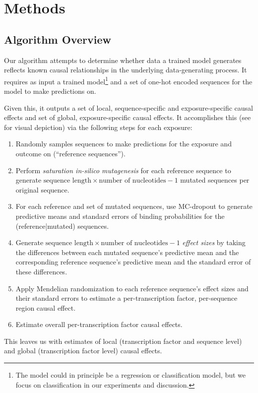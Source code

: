 \documentclass{article}
\begin{document}
\section{Methods}
\subsection{Algorithm Overview}
Our algorithm attempts to determine whether data a trained model generates reflects known causal relationships in the underlying data-generating process. It requires as input a trained model\footnote{The model could in principle be a regression or classification model, but we focus on classification in our experiments and discussion.} and a set of one-hot encoded sequences for the model to make predictions on.

Given this, it outputs a set of local, sequence-specific and exposure-specific causal effects and set of global, exposure-specific causal effects. It accomplishes this (see  for visual depiction) via the following steps for each exposure:
\begin{enumerate}
    \item Randomly samples sequences to make predictions for the exposure and outcome on (``reference sequences'').
    \item Perform \textit{saturation in-silico mutagenesis} for each reference sequence to generate \( \text{sequence\ length} \times \text{number\ of\ nucleotides} - 1 \) mutated sequences per original sequence.
    \label{}
    \item For each reference and set of mutated sequences, use MC-dropout  to generate predictive means and standard errors of binding probabilities for the (reference|mutated) sequences.
    \item Generate \( \text{sequence length} \times \text{number of nucleotides} - 1 \) \textit{effect sizes} by taking the differences between each mutated sequence's predictive mean and the corresponding reference sequence's predictive mean and the standard error of these differences.
    \item Apply Mendelian randomization to each reference sequence's effect sizes and their standard errors to estimate a per-transcription factor, per-sequence region causal effect.
    \item Estimate overall per-transcription factor causal effects.
\end{enumerate}

This leaves us with estimates of local (transcription factor and sequence level) and global (transcription factor level) causal effects. 
\end{document}

